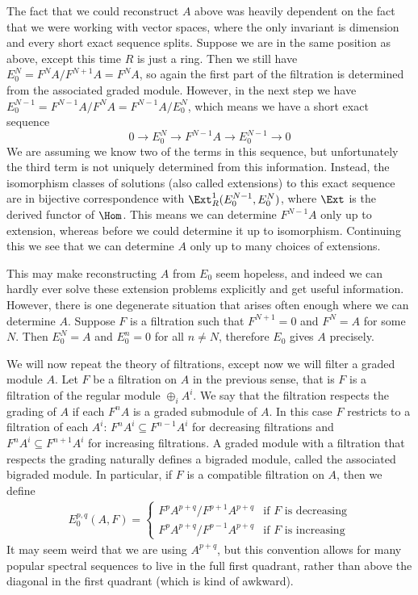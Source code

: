 The fact that we could reconstruct $A$ above was heavily dependent on the fact that we were working with vector spaces, where the only invariant is dimension and every short exact sequence splits. Suppose we are in the same position as above, except this time $R$ is just a ring. Then we still have $E_0^N = F^N A / F^{N+1} A = F^N A$, so again the first part of the filtration is determined from the associated graded module. However, in the next step we have $E_0^{N-1} = F^{N-1} A / F^N A = F^{N-1} A / E_0^N$, which means we have a short exact sequence
\[ 0 \longrightarrow E_0^N \longrightarrow F^{N-1} A \longrightarrow E_0^{N-1} \longrightarrow 0 \]
We are assuming we know two of the terms in this sequence, but unfortunately the third term is not uniquely determined from this information. Instead, the isomorphism classes of solutions (also called extensions) to this exact sequence are in bijective correspondence with $\Ext_R^1(E_0^{N-1},E_0^N)$, where $\Ext$ is the derived functor of $\Hom$. This means we can determine $F^{N-1} A$ only up to extension, whereas before we could determine it up to isomorphism. Continuing this we see that we can determine $A$ only up to many choices of extensions. 

This may make reconstructing $A$ from $E_0$ seem hopeless, and indeed we can hardly ever solve these extension problems explicitly and get useful information. However, there is one degenerate situation that arises often enough where we can determine $A$. Suppose $F$ is a filtration such that $F^{N+1} = 0$ and $F^N = A$ for some $N$. Then $E_0^N = A$ and $E_0^n = 0$ for all $n \neq N$, therefore $E_0$ gives $A$ precisely.

We will now repeat the theory of filtrations, except now we will filter a graded module $A$. Let $F$ be a filtration on $A$ in the previous sense, that is $F$ is a filtration of the regular module $\oplus_i A^i$. We say that the filtration respects the grading of $A$ if each $F^n A$ is a graded submodule of $A$. In this case $F$ restricts to a filtration of each $A^i$: $F^n A^i \subseteq F^{n-1} A^i$ for decreasing filtrations and $F^n A^i \subseteq F^{n+1} A^i$ for increasing filtrations. A graded module with a filtration that respects the grading naturally defines a bigraded module, called the associated bigraded module. In particular, if $F$ is a compatible filtration on $A$, then we define
\begin{align}
\label{associated bigraded module}
E_0^{p,q}(A,F) = \begin{cases} F^p A^{p+q} / F^{p+1} A^{p+q} & \text{if $F$ is decreasing} \\ F^p A^{p+q} / F^{p-1} A^{p+q} & \text{if $F$ is increasing} \end{cases}
\end{align}
It may seem weird that we are using $A^{p+q}$, but this convention allows for many popular spectral sequences to live in the full first quadrant, rather than above the diagonal in the first quadrant (which is kind of awkward).

